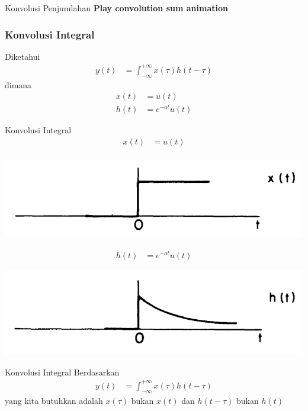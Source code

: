 \documentclass[pdflatex,compress,mathserif]{beamer}
\begin{document}
\begin{frame}{Konvolusi Penjumlahan}
	\textbf{Play convolution sum animation}
\end{frame}

\begin{frame}
	\frametitle{Konvolusi Integral}
	Diketahui
	\begin{align*}
		y(t) &= \int_{-\infty}^{+\infty} x(\tau) h(t-\tau)
	\end{align*}
	dimana
	\begin{align*}
		x(t) &= u(t) \\
		h(t) &= e^{-at} u(t)
	\end{align*}
\end{frame}

\begin{frame}{Konvolusi Integral}
	\begin{align*}
		x(t) &= u(t) \\
	\end{align*}
	\begin{center}
		\includegraphics[width=0.5\linewidth]{img/img12}
	\end{center}
	\begin{align*}
		h(t) &= e^{-at} u(t)
	\end{align*}
	\begin{center}
		\includegraphics[width=0.5\linewidth]{img/img13}
	\end{center}
\end{frame}

\begin{frame}{Konvolusi Integral}
	Berdasarkan
	\begin{align*}
		y(t) &= \int_{-\infty}^{+\infty} x(\tau) h(t-\tau)
	\end{align*}
	yang kita butuhkan adalah $ x(\tau) $ bukan $ x(t) $ dan $ h(t-\tau) $ bukan $ h(t) $
\end{frame}
\end{document}
